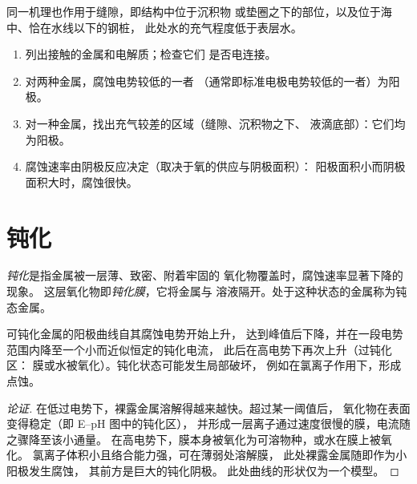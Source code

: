 同一机理也作用于缝隙，即结构中位于沉积物
或垫圈之下的部位，以及位于海中、恰在水线以下的钢桩，
此处水的充气程度低于表层水。

\begin{method}[腐蚀诊断]\label{met:b2:corrosion:diagnose}
\begin{enumerate}
  \item 列出接触的金属和电解质；检查它们
        是否电连接。
  \item 对两种金属，腐蚀电势较低的一者
        （通常即标准电极电势较低的一者）为阳极。
  \item 对一种金属，找出充气较差的区域（缝隙、沉积物之下、
        液滴底部）：它们均为阳极。
  \item 腐蚀速率由阴极反应决定（取决于氧的供应与阴极面积）：
        阳极面积小而阴极面积大时，腐蚀很快。
\end{enumerate}
\end{method}

\section{钝化}

\begin{definition}[钝化]\label{def:b2:corrosion:passivation}
\emph{钝化}是指金属被一层薄、致密、附着牢固的
氧化物覆盖时，腐蚀速率显著下降的现象。
这层氧化物即\emph{钝化膜}，它将金属与
溶液隔开。处于这种状态的金属称为钝态金属。
\end{definition}

\begin{proposition}[钝化平台]\label{prop:b2:corrosion:passivity}
可钝化金属的阳极曲线自其腐蚀电势开始上升，
达到峰值后下降，并在一段电势范围内降至一个小而近似恒定的钝化电流，
此后在高电势下再次上升（过钝化区：
膜或水被氧化）。钝化状态可能发生局部破坏，
例如在氯离子作用下，形成点蚀。
\end{proposition}

\begin{proof}[论证]
在低过电势下，裸露金属溶解得越来越快。超过某一阈值后，
氧化物在表面变得稳定（即 E--pH 图中的钝化区），
并形成一层离子通过速度很慢的膜，电流随之骤降至该小通量。
在高电势下，膜本身被氧化为可溶物种，或水在膜上被氧化。
氯离子体积小且络合能力强，可在薄弱处溶解膜，
此处裸露金属随即作为小阳极发生腐蚀，
其前方是巨大的钝化阴极。
此处曲线的形状仅为一个模型。
\end{proof}

